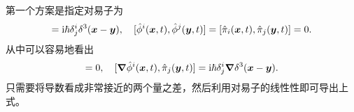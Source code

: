 \documentclass[UTF8, a4paper]{ctexart}
\newcommand*{\ii}{\mathrm{i}}
\begin{document}
第一个方案是指定对易子为
\begin{equation}
    [\hat{\phi}^i(\vb*{x}, t), \hat{\pi}_j(\vb*{y}, t)] = \ii \hbar \delta^i_j \delta^3(\vb*{x} - \vb*{y}), 
    \quad [\hat{\phi}^i(\vb*{x}, t), \hat{\phi}^j(\vb*{y}, t)] = [\hat{\pi}_i(\vb*{x}, t), \hat{\pi}_j(\vb*{y}, t)] = 0.
    \label{eq:symmetry-commutator}
\end{equation}
从中可以容易地看出
\begin{equation}
    [\partial_\mu \hat{\phi}^i(\vb*{x}, t), \hat{\phi}^j(\vb*{y}, t)] = 0, 
    \quad [\grad{\hat{\phi}^i(\vb*{x}, t)}, \hat{\pi}_j(\vb*{y}, t)] = \ii \hbar \delta^i_j \grad{\delta^3(\vb*{x} - \vb*{y})}.
    \label{eq:symmetry-partial-mu-commutator}
\end{equation}
只需要将导数看成非常接近的两个量之差，然后利用对易子的线性性即可导出上式。
\end{document}

